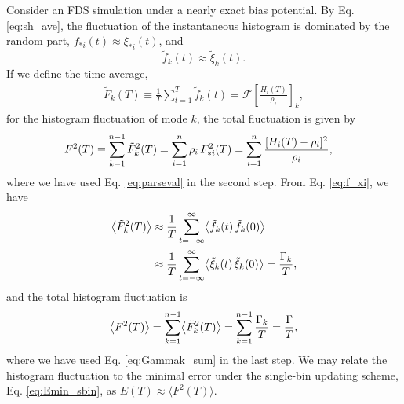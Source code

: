 \documentclass[preprint, superscriptaddress, floatfix]{revtex4-1}
\newcommand{\Err}{E}
\begin{document}
Consider an FDS simulation
under a nearly exact bias potential.
%
By Eq. \eqref{eq:sh_ave},
the fluctuation of the instantaneous histogram
is dominated by the random part,
$f_{*i}(t) \approx \xi_{*i}(t)$, and
%
\begin{equation}
  \tilde f_k(t) \approx \tilde \xi_k(t)
  .
  \label{eq:f_xi}
\end{equation}
%
If we define the time average,
%
\begin{align*}
  \tilde F_k(T) \equiv \frac 1 T \sum_{t = 1}^T \tilde f_k(t)
  =\mathcal F\left[ \frac{ H_i(T) } { \rho_i } \right]_k
  ,
\end{align*}
%
for the histogram fluctuation of mode $k$,
the total fluctuation is given by
%
\begin{align}
  F^2(T)
  &\equiv
  \sum_{k=1}^{n-1} \tilde F_k^2(T)
  =
  \sum_{i=1}^{n} \rho_i \, F_{*i}^2(T)
  =
  \sum_{i=1}^n
  \frac{ [ H_i(T) -\rho_i]^2 }{\rho_i}
  ,
  \notag
\end{align}
%
where we have used Eq. \eqref{eq:parseval} in the second step.
%
From Eq. \eqref{eq:f_xi}, we have
%
\begin{align}
  \bigl\langle \tilde F_k^2(T) \bigr\rangle
  &\approx
  \frac{1}{T}
  \sum_{t=-\infty}^\infty
  \bigl\langle
    \tilde f_k(t) \, \tilde f_k(0)
  \bigr\rangle
  \notag \\
  &\approx
  \frac{1}{T}
  \sum_{t=-\infty}^\infty
  \bigl\langle
    \tilde \xi_k(t) \, \tilde \xi_k(0)
  \bigr\rangle
  =
  \frac{ \Gamma_k } { T }
  ,
  \label{eq:Fk2_Gammak}
\end{align}
%
and the total histogram fluctuation is
\begin{equation}
  \bigl\langle F^2(T) \bigr\rangle
  =
  \sum_{k=1}^{n-1}
  \bigl\langle \tilde F_k^2(T) \bigr\rangle
  =
  \sum_{k=1}^{n-1}
  \frac{ \Gamma_k } { T }
  =
  \frac{ \Gamma } { T }
  ,
  \notag
\end{equation}
where we have used Eq. \eqref{eq:Gammak_sum}
in the last step.
%
We may relate the histogram fluctuation
to the minimal error under the single-bin updating scheme,
Eq. \eqref{eq:Emin_sbin}, as
  $\Err(T) \approx \bigl\langle F^2(T) \bigr\rangle$.
%
\end{document}
